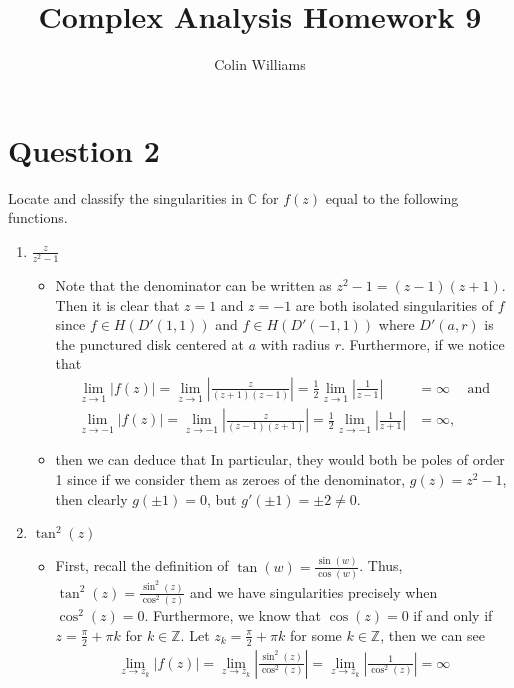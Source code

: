 \documentclass[10pt,a4paper]{article}
\title{Complex Analysis Homework 9}
\author{Colin Williams}
\theoremstyle{definition}
\begin{document}
\maketitle

\section*{Question 2}
Locate and classify the singularities in $\mathbb{C}$ for $f(z)$ equal to the following functions.
\begin{enumerate}[label = (\alph*)]
\item $\displaystyle \frac{z}{z^2 - 1}$
	\begin{itemize}
	\item Note that the denominator can be written as $z^2 - 1 = (z - 1)(z + 1)$. Then it is clear that $z = 1$ and $z = -1$ are both isolated singularities of $f$ since $f \in H(D'(1,1))$ and $f \in H(D'(-1, 1))$ where $D'(a,r)$ is the punctured disk centered at $a$ with radius $r$. Furthermore, if we notice that
	\begin{align*}
	\lim_{z \to 1}|f(z)| = \lim_{z \to 1}\left|\frac{z}{(z + 1)(z - 1)}\right| = \frac{1}{2}\lim_{z \to 1} \left|\frac{1}{z - 1}\right| &= \infty &\text{and}\\
	\lim_{z \to -1}|f(z)| = \lim_{z \to -1}\left|\frac{z}{(z - 1)(z + 1)}\right| = \frac{1}{2} \lim_{z \to -1}\left|\frac{1}{z + 1}\right| &= \infty,
	\end{align*}
	\item then we can deduce that  In particular, they would both be poles of order 1 since if we consider them as zeroes of the denominator, $g(z) = z^2 - 1$, then clearly $g(\pm 1) = 0$, but $g'(\pm 1) = \pm 2 \neq 0$.
	\end{itemize}
\item $\tan^2(z)$
	\begin{itemize}
	\item First, recall the definition of $\tan(w) = \frac{\sin(w)}{\cos(w)}$. Thus, $\tan^2(z) = \frac{\sin^2(z)}{\cos^2(z)}$ and we have singularities precisely when $\cos^2(z) = 0$. Furthermore, we know that $\cos(z) = 0$ if and only if $z = \frac{\pi}{2} + \pi k$ for $k \in \mathbb{Z}$. Let $z_k = \frac{\pi}{2} + \pi k$ for some $k \in \mathbb{Z}$, then we can see
	\begin{align*}
	\lim_{z \to z_k}\left|f(z)\right| = \lim_{z \to z_k}\left|\frac{\sin^2(z)}{\cos^2(z)}\right| = \lim_{z \to z_k} \left|\frac{1}{\cos^2(z)}\right| = \infty

\end{align*}
\end{itemize}
\end{enumerate}
\end{document}
